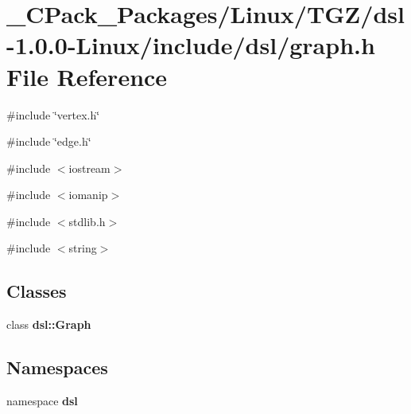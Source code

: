 \section{\_\-CPack\_\-Packages/Linux/TGZ/dsl-\/1.0.0-\/Linux/include/dsl/graph.h File Reference}
\label{__CPack__Packages_2Linux_2TGZ_2dsl-1_80_80-Linux_2include_2dsl_2graph_8h}
{\ttfamily \#include \char`\"{}vertex.h\char`\"{}}\par
{\ttfamily \#include \char`\"{}edge.h\char`\"{}}\par
{\ttfamily \#include $<$iostream$>$}\par
{\ttfamily \#include $<$iomanip$>$}\par
{\ttfamily \#include $<$stdlib.h$>$}\par
{\ttfamily \#include $<$string$>$}\par
\subsection*{Classes}
\begin{DoxyCompactItemize}
\item 
class {\bf dsl::Graph}
\end{DoxyCompactItemize}
\subsection*{Namespaces}
\begin{DoxyCompactItemize}
\item 
namespace {\bf dsl}
\end{DoxyCompactItemize}
